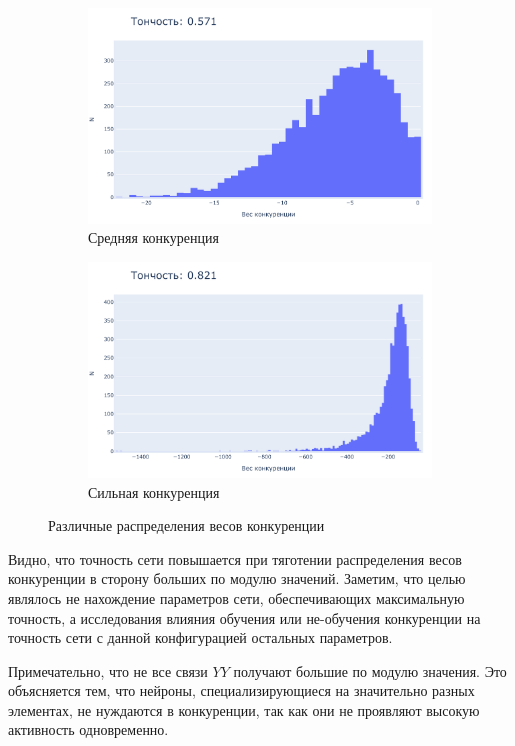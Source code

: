 \documentclass[a4paper]{article}
\begin{document}
\begin{figure}
\begin{subfigure}{0.22\textwidth}
    \includegraphics[width=\textwidth,keepaspectratio=true]{competition_distribution_medium_good_ru.pdf}
    \caption{Средняя конкуренция} 
\end{subfigure}
\begin{subfigure}{0.22\textwidth}
    \includegraphics[width=\textwidth,keepaspectratio=true]{competition_distribution_best_ru.pdf}
    \caption{Сильная конкуренция}
\end{subfigure}
\caption{Различные распределения весов конкуренции}
\end{figure}

Видно, что точность сети повышается при тяготении распределения весов конкуренции в сторону больших по модулю значений. Заметим, что целью являлось не нахождение параметров сети, обеспечивающих максимальную точность, а исследования влияния обучения или не-обучения конкуренции на точность сети с данной конфигурацией остальных параметров.

Примечательно, что не все связи $YY$ получают большие по модулю значения. Это объясняется тем, что нейроны, специализирующиеся на значительно разных элементах, не нуждаются в конкуренции, так как они не проявляют высокую активность одновременно.
\end{document}
